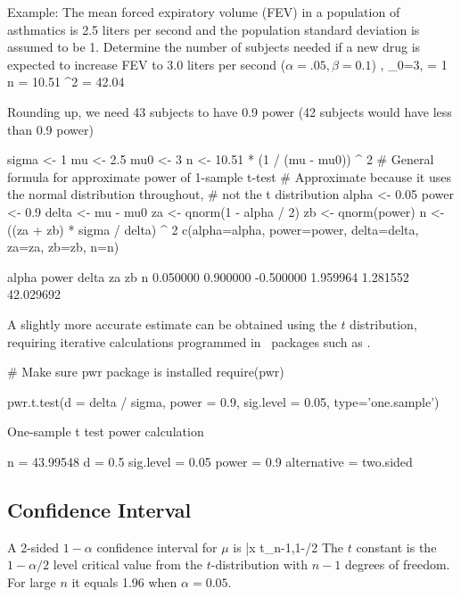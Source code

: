 \item Example: The mean forced expiratory volume (FEV) in a population of asthmatics is 2.5 liters per second and the population standard deviation is assumed to be 1.  Determine the number of subjects needed if a new drug is expected to increase FEV to 3.0 liters per second ($\alpha = .05, \beta = 0.1$)
\beqa
{}, \mu_0=3, \sigma = 1 \\
n = 10.51 ^{2} = 42.04
\eeqa
  \bi
  \item \textrm{Rounding up, we need 43 subjects to have 0.9 power (42 subjects would have less than 0.9 power)}
  \ei
\ei
\begin{Schunk}
\begin{Sinput}
sigma <- 1
mu    <- 2.5
mu0   <- 3
n     <- 10.51 * (1 / (mu - mu0)) ^ 2
# General formula for approximate power of 1-sample t-test
# Approximate because it uses the normal distribution throughout,
# not the t distribution
alpha <- 0.05
power <- 0.9
delta <- mu - mu0
za    <- qnorm(1 - alpha / 2)
zb    <- qnorm(power)
n     <- ((za + zb) * sigma / delta) ^ 2
c(alpha=alpha, power=power, delta=delta, za=za, zb=zb, n=n)
\end{Sinput}
\begin{Soutput}
    alpha     power     delta        za        zb         n 
 0.050000  0.900000 -0.500000  1.959964  1.281552 42.029692 
\end{Soutput}
\end{Schunk}
A slightly more accurate estimate can be obtained using the $t$
distribution, requiring iterative calculations programmed in \R\
packages such as .
\begin{Schunk}
\begin{Sinput}
# Make sure pwr package is installed
require(pwr)
\end{Sinput}
\begin{Sinput}
pwr.t.test(d = delta / sigma, power = 0.9, sig.level = 0.05, type='one.sample')
\end{Sinput}
\begin{Soutput}

     One-sample t test power calculation 

              n = 43.99548
              d = 0.5
      sig.level = 0.05
          power = 0.9
    alternative = two.sided
\end{Soutput}
\end{Schunk}

\subsection{Confidence Interval} 
A 2-sided $1-\alpha$ confidence interval for $\mu$ is
\beq
\bar{x} \pm t_{n-1,1-\alpha/2} 
\eeq
The $t$ constant is the $1-\alpha/2$ level critical value from the
$t$-distribution with $n-1$ degrees of freedom.  For large $n$ it
equals 1.96 when $\alpha=0.05$.

